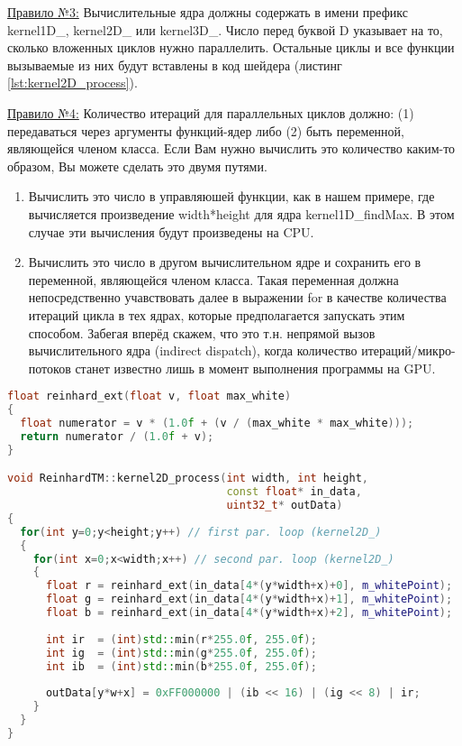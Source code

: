 \documentclass[11pt,fleqn,english,russian]{report} %
\begin{document}
\underline{Правило №3:} Вычислительные ядра должны содержать в имени префикс kernel1D\_, kernel2D\_ или kernel3D\_. Число перед буквой D указывает на то, сколько вложенных циклов нужно параллелить. Остальные циклы и все функции вызываемые из них будут вставлены в код шейдера (листинг \ref{lst:kernel2D_process}). 

\underline{Правило №4:} Количество итераций для параллельных циклов должно: (1) передаваться через аргументы функций-ядер либо (2) быть переменной, являющейся членом класса. Если Вам нужно вычислить это количество каким-то образом, Вы можете сделать это двумя путями.
\begin{enumerate}
\item Вычислить это число в управляюшей функции, как в нашем примере, где вычисляется произведение width*height для ядра kernel1D\_findMax. В этом случае эти вычисления будут произведены на CPU.
\item Вычислить это число в другом вычислительном ядре и сохранить его в переменной, являющейся членом класса. Такая переменная должна непосредственно учавствовать далее в выражении for в качестве количества итераций цикла в тех ядрах, которые предполагается запускать этим способом. Забегая вперёд скажем, что это т.н. непрямой вызов вычислительного ядра (indirect dispatch), когда количество итераций/микро-потоков станет известно лишь в момент выполнения программы на GPU. 
\end{enumerate}

\begin{lstlisting}[language=C++, 
	               caption=двумерное вычислительнрео ядро вызывает функцию reinhard\_ext, 
	               label=lst:kernel2D_process]	
float reinhard_ext(float v, float max_white)
{
  float numerator = v * (1.0f + (v / (max_white * max_white)));
  return numerator / (1.0f + v);
}

void ReinhardTM::kernel2D_process(int width, int height, 
                                  const float* in_data, 
                                  uint32_t* outData)
{
  for(int y=0;y<height;y++) // first par. loop (kernel2D_)
  {
    for(int x=0;x<width;x++) // second par. loop (kernel2D_)
    {
      float r = reinhard_ext(in_data[4*(y*width+x)+0], m_whitePoint);
      float g = reinhard_ext(in_data[4*(y*width+x)+1], m_whitePoint);
      float b = reinhard_ext(in_data[4*(y*width+x)+2], m_whitePoint);
			
      int ir  = (int)std::min(r*255.0f, 255.0f);
      int ig  = (int)std::min(g*255.0f, 255.0f);
      int ib  = (int)std::min(b*255.0f, 255.0f);
			
      outData[y*w+x] = 0xFF000000 | (ib << 16) | (ig << 8) | ir;
    }
  }
}
\end{lstlisting}
\end{document}

